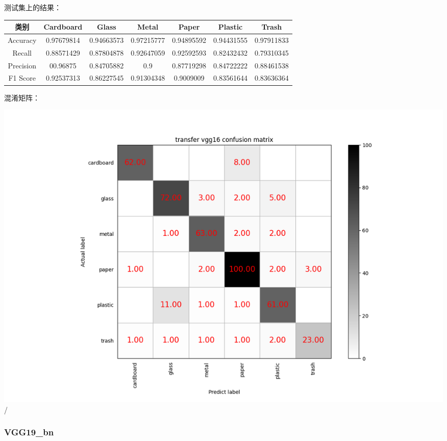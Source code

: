 \documentclass[UTF8]{ctexart}
\begin{document}
测试集上的结果：

\begin{tabular}{|c|c|c|c|c|c|c|}
\hline 
类别 & Cardboard & Glass & Metal & Paper & Plastic & Trash \\ 
\hline 
Accuracy &0.97679814& 0.94663573& 0.97215777& 0.94895592& 0.94431555& 0.97911833\\
 \hline 
Recall &0.88571429& 0.87804878 &0.92647059& 0.92592593& 0.82432432& 0.79310345\\ 
\hline 
Precision &00.96875   & 0.84705882 &0.9       & 0.87719298& 0.84722222& 0.88461538 \\ 
\hline 
F1 Score &0.92537313& 0.86227545 &0.91304348& 0.9009009&  0.83561644& 0.83636364 \\ 
\hline 
\end{tabular}

混淆矩阵：

\includegraphics[scale=0.5]{cm/vgg16.png} /

 
\subsubsection{VGG19\_bn}
\end{document}
